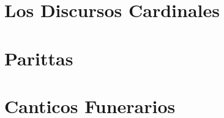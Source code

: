 \suttasPartSettings


\part{Los Discursos Cardinales}

\suttasChapterSettings



\suttasSettingsRestore

%
\part{Parittas}

%

%
%
%
\part{Canticos Funerarios}
%
%

%

